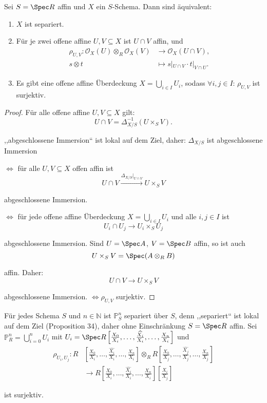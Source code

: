 \begin{prop}[36]
  Sei $S=\Spec R$ affin und $X$ ein $S$-Schema. Dann sind äquivalent:
  \begin{enumerate}
  \item $X$ ist separiert.
  \item Für je zwei offene affine $U,V\subseteq X$ ist $U\cap V$ affin,
    und
    \begin{align*}
      \rho_{U,V}:\mathcal{O}_{X}(U)\otimes_{R}\mathcal{O}_{X}(V) & \longrightarrow\mathcal{O}_{X}(U\cap V),\\
      s\otimes t & \longmapsto s|_{U\cap V}\cdot t|_{V\cap U}.
    \end{align*}
  \item Es gibt eine offene affine Überdeckung $X=\bigcup_{i\in I}U_{i}$,
    sodass $\forall i,j\in I$: $\rho_{U,V}$ ist surjektiv.
  \end{enumerate}
\end{prop}

\begin{proof}
  Für alle offene affine $U,V\subseteq X$ gilt:
  \[
    U\cap V=\Delta_{X/S}^{-1}(U\times_{S}V).
  \]

  ,,abgeschlossene Immersion`` ist lokal auf dem Ziel, daher: $\Delta_{X/S}$
  ist abgeschlossene Immersion

  $\Longleftrightarrow$ für alle $U,V\subseteq X$ offen affin ist
  \[
    U\cap V\xrightarrow{\Delta_{X/S}|_{U\cap V}}U\times_{S}V
  \]

  abgeschlossene Immersion.

  $\Longleftrightarrow$ für jede offene affine Überdeckung $X=\bigcup_{i\in I}U_{i}$
  und alle $i,j\in I$ ist
  \[
    U_{i}\cap U_{j}\longrightarrow U_{i}\times_{S}U_{j}
  \]

  abgeschlossene Immersion. Sind $U=\Spec A$, $V=\Spec B$ affin, so
  ist auch
  \[
    U\times_{S}V=\Spec(A\otimes_{R}B)
  \]

  affin. Daher:
  \[
    U\cap V\longrightarrow U\times_{S}V
  \]

  abgeschlossene Immersion. $\Longleftrightarrow\rho_{U,V}$ surjektiv.
\end{proof}
\begin{example}[37]
  Für jedes Schema $S$ und $n\in\mathbb{N}$ ist $\mathbb{P}_{S}^{n}$
  separiert über $S$, denn ,,separiert`` ist lokal auf dem Ziel (Proposition
  34), daher ohne Einschränkung $S=\Spec R$ affin. Sei $\mathbb{P}_{R}^{n}=\bigcup_{i=0}^{n}U_{i}$
  mit $U_{i}=\Spec R\left[\frac{X_{0}}{X_{i}},\ldots,\frac{\widehat{X_{i}}}{X_{i}},\ldots,\frac{X_{n}}{X_{i}}\right]$
  und
  \begin{align*}
    \rho_{U_{i},U_{j}}:R & \left[\frac{X_{0}}{X_{i}},\ldots,\frac{\widehat{X_{i}}}{X_{i}},\ldots,\frac{X_{n}}{X_{i}}\right]\otimes_{R}R\left[\frac{X_{0}}{X_{j}},\ldots,\frac{\widehat{X_{j}}}{X_{j}},\ldots,\frac{X_{n}}{X_{j}}\right]\\
                         & \longrightarrow R\left[\frac{X_{0}}{X_{i}},\ldots,\frac{\widehat{X_{i}}}{X_{i}},\ldots,\frac{X_{n}}{X_{i}}\right]\left[\frac{X_{i}}{X_{j}}\right]
  \end{align*}

  ist surjektiv.
\end{example}

